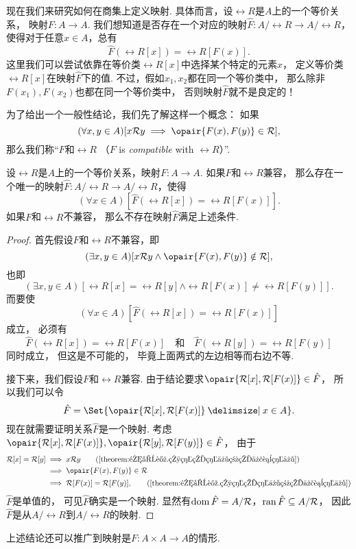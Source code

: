 现在我们来研究如何在商集上定义映射.
具体而言，设\(\rel{R}\)是\(A\)上的一个等价关系，
映射\(F\colon A \to A\).
我们想知道是否存在一个对应的映射\(\hat{F}\colon A/\rel{R} \to A/\rel{R}\)，
使得对于任意\(x \in A\)，总有\[
	\hat{F}(\rel{R}[x]) = \rel{R}[F(x)].
\]
这里我们可以尝试依靠在等价类\(\rel{R}[x]\)中选择某个特定的元素\(x\)，
定义等价类\(\rel{R}[x]\)在映射\(\hat{F}\)下的值.
不过，假如\(x_1,x_2\)都在同一个等价类中，
那么除非\(F(x_1),F(x_2)\)也都在同一个等价类中，
否则映射\(\hat{F}\)就不是良定的！

为了给出一个一般性结论，我们先了解这样一个概念：
如果\[
	(\forall x,y \in A)
	[
		x \rel{R} y
		\implies
		\opair{F(x),F(y)} \in \rel{R}
	],
\]
那么我们称“\(F\)和\(\rel{R}\) %
（\(F\) is \emph{compatible} with \(\rel{R}\)）”.

\begin{theorem}\label{theorem:集合论.与等价关系兼容的映射的性质}
设\(\rel{R}\)是\(A\)上的一个等价关系，映射\(F\colon A \to A\).
如果\(F\)和\(\rel{R}\)兼容，
那么存在一个唯一的映射\(\hat{F}\colon A/\rel{R} \to A/\rel{R}\)，使得\[
	(\forall x \in A)
	[
		\hat{F}(\rel{R}[x]) = \rel{R}[F(x)]
	].
\]
如果\(F\)和\(\rel{R}\)不兼容，
那么不存在映射\(\hat{F}\)满足上述条件.
\begin{proof}
首先假设\(F\)和\(\rel{R}\)不兼容，即\[
	(\exists x,y \in A)
	[
		x \rel{R} y
		\land
		\opair{F(x),F(y)} \notin \rel{R}
	],
\]
也即\[
	(\exists x,y \in A)
	[
		\rel{R}[x] = \rel{R}[y]
		\land
		\rel{R}[F(x)] \neq \rel{R}[F(y)]
	].
\]
而要使\[
	(\forall x \in A)
	[
		\hat{F}(\rel{R}[x]) = \rel{R}[F(x)]
	]
\]成立，
必须有\[
	\hat{F}(\rel{R}[x])
	= \rel{R}[F(x)]
	\quad\text{和}\quad
	\hat{F}(\rel{R}[y])
	= \rel{R}[F(y)]
\]同时成立，
但这是不可能的，
毕竟上面两式的左边相等而右边不等.

接下来，我们假设\(F\)和\(\rel{R}\)兼容.
由于结论要求\(\opair{\rel{R}[x],\rel{R}[F(x)]} \in \hat{F}\)，
所以我们可以令\[
	\hat{F} = \Set{ \opair{\rel{R}[x],\rel{R}[F(x)]} \given x \in A }.
\]
现在就需要证明关系\(\hat{F}\)是一个映射.
考虑\(\opair{\rel{R}[x],\rel{R}[F(x)]},
\opair{\rel{R}[y],\rel{R}[F(y)]} \in \hat{F}\)，
由于\begin{align*}
	\rel{R}[x] = \rel{R}[y]
	&\implies
	x \rel{R} y
	\tag{\cref{theorem:集合论.相等的等价类的代表等价}} \\
	&\implies
	\opair{F(x),F(y)} \in \rel{R} \\
	&\implies
	\rel{R}[F(x)] = \rel{R}[F(y)],
	\tag{\cref{theorem:集合论.相等的等价类的代表等价}}
\end{align*}
\(\hat{F}\)是单值的，
可见\(\hat{F}\)确实是一个映射.
显然有\(\operatorname{dom} \hat{F} = A/\mathcal{R}\)，\(\operatorname{ran} \hat{F} \subseteq A/\mathcal{R}\)，
因此\(\hat{F}\)是从\(A/\rel{R}\)到\(A/\rel{R}\)的映射.
\end{proof}
\end{theorem}
上述结论还可以推广到映射是\(F\colon A \times A \to A\)的情形.
